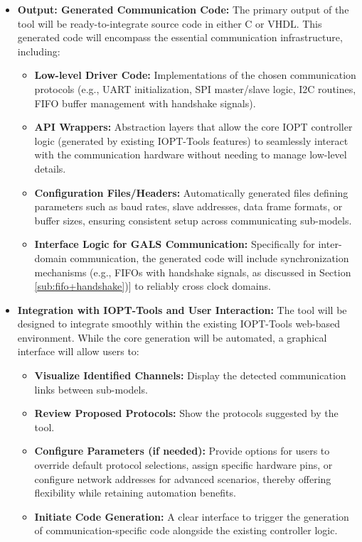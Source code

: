 \begin{itemize}
    \item \textbf{Output: Generated Communication Code:} The primary output of the tool will be ready-to-integrate source code in either C or VHDL. This generated code will encompass the essential communication infrastructure, including:
    \begin{itemize}
       \item \textbf{Low-level Driver Code:} Implementations of the chosen communication protocols (e.g., UART initialization, SPI master/slave logic, I2C routines, FIFO buffer management with handshake signals).
        \item \textbf{API Wrappers:} Abstraction layers that allow the core IOPT controller logic (generated by existing IOPT-Tools features) to seamlessly interact with the communication hardware without needing to manage low-level details.
        \item \textbf{Configuration Files/Headers:} Automatically generated files defining parameters such as baud rates, slave addresses, data frame formats, or buffer sizes, ensuring consistent setup across communicating sub-models.
        \item \textbf{Interface Logic for GALS Communication:} Specifically for inter-domain communication, the generated code will include synchronization mechanisms (e.g., FIFOs with handshake signals, as discussed in Section \ref{sub:fifo+handshake})] to reliably cross clock domains.
    \end{itemize}

    \item \textbf{Integration with IOPT-Tools and User Interaction:} The tool will be designed to integrate smoothly within the existing IOPT-Tools web-based environment. While the core generation will be automated, a graphical interface will allow users to:
    \begin{itemize}
        \item \textbf{Visualize Identified Channels:} Display the detected communication links between sub-models.
        \item \textbf{Review Proposed Protocols:} Show the protocols suggested by the tool.
        \item \textbf{Configure Parameters (if needed):} Provide options for users to override default protocol selections, assign specific hardware pins, or configure network addresses for advanced scenarios, thereby offering flexibility while retaining automation benefits.
        \item \textbf{Initiate Code Generation:} A clear interface to trigger the generation of communication-specific code alongside the existing controller logic.
    \end{itemize}
\end{itemize}

